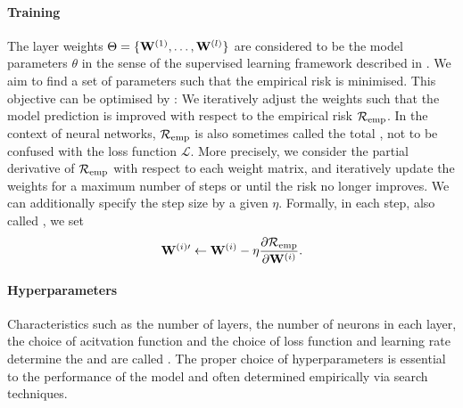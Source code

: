 \documentclass[
	fontsize=10pt, %
	twoside=true, %
	secnumdepth=1, %
  toc=indentunnumbered %
]{kaobook}
\begin{document}
\paragraph{Training} The layer weights $\Theta = \{\mathbf{W}^{(1)}, \ldots,
\mathbf{W}^{(l)}\}$ are considered to be the model parameters $\theta$ in the sense
of the supervised learning framework described in .
We aim to find a set of parameters such that the empirical risk is minimised.
This objective can be
optimised by : We iteratively adjust the weights
such that the model prediction is improved with respect to the empirical risk
$\mathcal{R}_{\text{emp}}$. In the context of neural networks, $\mathcal{R}_{\text{emp}}$ is also sometimes called the
total , not to be confused with the loss function $\mathcal{L}$. More
precisely, we consider the partial derivative of $\mathcal{R}_{\text{emp}}$ with respect to each
weight matrix, and iteratively update the weights for a maximum number of steps
or until the risk no longer improves. We can additionally specify the step size
by a given  $\eta$. Formally, in each step, also called
, we set
\begin{align*}
\mathbf{W}^{(i)\prime} \gets
\mathbf{W}^{(i)} - \eta \frac{\partial \mathcal{R}_{\text{emp}}}{\partial \mathbf{W}^{(i)}}.
\end{align*}

\paragraph{Hyperparameters} Characteristics such as the number of layers, the
number of neurons in each layer, the choice of acitvation function and the
choice of loss function and learning rate determine the 
and are called . The proper choice of hyperparameters is
essential to the performance of the model and often determined empirically via
search techniques.
\end{document}
